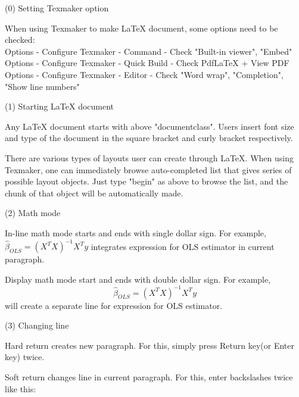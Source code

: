 \documentclass[11pt]{article}
\begin{document}
(0) Setting Texmaker option

When using Texmaker to make LaTeX document, some options need to be checked:\\
Options - Configure Texmaker - Command - Check "Built-in viewer", "Embed"\\
Options - Configure Texmaker - Quick Build - Check PdfLaTeX + View PDF\\
Options - Configure Texmaker - Editor - Check "Word wrap", "Completion", "Show line numbers"

(1) Starting LaTeX document

Any LaTeX document starts with above "documentclass". Users insert font size and type of the document in the square bracket and curly bracket respectively.

There are various types of layouts user can create through LaTeX. When using Texmaker, one can immediately browse auto-completed list that gives series of possible layout objects. Just type "begin" as above to browse the list, and the chunk of that object will be automatically made.

(2) Math mode

In-line math mode starts and ends with single dollar sign. For example, $\hat{\beta}_{OLS}=(X^{T}X)^{-1}X^{T}y$ integrates expression for OLS estimator in current paragraph.

Display math mode start and ends with double dollar sign. For example, $$\hat{\beta}_{OLS}=(X^{T}X)^{-1}X^{T}y$$ will create a separate line for expression for OLS estimator.

(3) Changing line

Hard return creates new paragraph. For this, simply press Return key(or Enter key) twice.

Soft return changes line in current paragraph. For this, enter backslashes twice like this: \\
\end{document}
